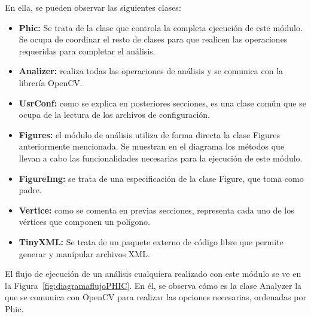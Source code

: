 En ella, se pueden observar las siguientes clases:\\

\begin{itemize}

	\item \textbf{Phic:} Se trata de la clase que controla la completa ejecución de este módulo. Se ocupa de coordinar el resto de clases para que realicen las operaciones requeridas para completar el análisis.
	
	\item \textbf{Analizer:} realiza todas las operaciones de análisis y se comunica con la librería OpenCV.
	
	\item \textbf{UsrConf:} como se explica en posteriores secciones, es una clase común que se ocupa de la lectura de los archivos de configuración.
	
	\item \textbf{Figures:} el módulo de análisis utiliza de forma directa la clase Figures anteriormente mencionada. Se muestran en el diagrama los métodos que llevan a cabo las funcionalidades necesarias para la ejecución de este módulo.
	
	\item \textbf{FigureImg:} se trata de una especificación de la clase Figure, que toma como padre.
	
	\item \textbf{Vertice:} como se comenta en previas secciones, representa cada uno de los vértices que componen un polígono. 
	
	\item \textbf{TinyXML:} Se trata de un paquete externo de código libre que permite generar y manipular archivos XML.
	
	
\end{itemize}
			
El flujo de ejecución de un análisis cualquiera realizado con este módulo se ve en la Figura~\ref{fig:diagramaflujoPHIC}. En él, se observa cómo es la clase Analyzer la que se comunica con OpenCV para realizar las opciones necesarias, ordenadas por Phic.\\

